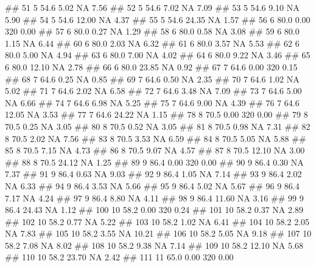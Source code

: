 \documentclass[10pt,]{krantz}
\makeatletter
\newenvironment{Shaded}{\begin{snugshade}}{\end{snugshade}}
\newcommand{\NormalTok}[1]{#1}
\newenvironment{kframe}{%
\medskip{}
\setlength{\fboxsep}{.8em}
 \def\at@end@of@kframe{}%
 \ifinner\ifhmode%
  \def\at@end@of@kframe{\end{minipage}}%
  \begin{minipage}{\columnwidth}%
 \fi\fi%
 \def\FrameCommand##1{\hskip\@totalleftmargin \hskip-\fboxsep
 \colorbox{shadecolor}{##1}\hskip-\fboxsep
     \hskip-\linewidth \hskip-\@totalleftmargin \hskip\columnwidth}%
 \MakeFramed {\advance\hsize-\width
   \@totalleftmargin\z@ \linewidth\hsize
   \@setminipage}}%
 {\par\unskip\endMakeFramed%
 \at@end@of@kframe}
\renewenvironment{Shaded}{\begin{kframe}}{\end{kframe}}
\theoremstyle{definition}
\theoremstyle{definition}
\theoremstyle{remark}
\makeatother
\begin{document}
\begin{Shaded}
\begin{Highlighting}[]
\NormalTok{## 51   5 54.6  5.02  NA  7.56}
\NormalTok{## 52   5 54.6  7.02  NA  7.09}
\NormalTok{## 53   5 54.6  9.10  NA  5.90}
\NormalTok{## 54   5 54.6 12.00  NA  4.37}
\NormalTok{## 55   5 54.6 24.35  NA  1.57}
\NormalTok{## 56   6 80.0  0.00 320  0.00}
\NormalTok{## 57   6 80.0  0.27  NA  1.29}
\NormalTok{## 58   6 80.0  0.58  NA  3.08}
\NormalTok{## 59   6 80.0  1.15  NA  6.44}
\NormalTok{## 60   6 80.0  2.03  NA  6.32}
\NormalTok{## 61   6 80.0  3.57  NA  5.53}
\NormalTok{## 62   6 80.0  5.00  NA  4.94}
\NormalTok{## 63   6 80.0  7.00  NA  4.02}
\NormalTok{## 64   6 80.0  9.22  NA  3.46}
\NormalTok{## 65   6 80.0 12.10  NA  2.78}
\NormalTok{## 66   6 80.0 23.85  NA  0.92}
\NormalTok{## 67   7 64.6  0.00 320  0.15}
\NormalTok{## 68   7 64.6  0.25  NA  0.85}
\NormalTok{## 69   7 64.6  0.50  NA  2.35}
\NormalTok{## 70   7 64.6  1.02  NA  5.02}
\NormalTok{## 71   7 64.6  2.02  NA  6.58}
\NormalTok{## 72   7 64.6  3.48  NA  7.09}
\NormalTok{## 73   7 64.6  5.00  NA  6.66}
\NormalTok{## 74   7 64.6  6.98  NA  5.25}
\NormalTok{## 75   7 64.6  9.00  NA  4.39}
\NormalTok{## 76   7 64.6 12.05  NA  3.53}
\NormalTok{## 77   7 64.6 24.22  NA  1.15}
\NormalTok{## 78   8 70.5  0.00 320  0.00}
\NormalTok{## 79   8 70.5  0.25  NA  3.05}
\NormalTok{## 80   8 70.5  0.52  NA  3.05}
\NormalTok{## 81   8 70.5  0.98  NA  7.31}
\NormalTok{## 82   8 70.5  2.02  NA  7.56}
\NormalTok{## 83   8 70.5  3.53  NA  6.59}
\NormalTok{## 84   8 70.5  5.05  NA  5.88}
\NormalTok{## 85   8 70.5  7.15  NA  4.73}
\NormalTok{## 86   8 70.5  9.07  NA  4.57}
\NormalTok{## 87   8 70.5 12.10  NA  3.00}
\NormalTok{## 88   8 70.5 24.12  NA  1.25}
\NormalTok{## 89   9 86.4  0.00 320  0.00}
\NormalTok{## 90   9 86.4  0.30  NA  7.37}
\NormalTok{## 91   9 86.4  0.63  NA  9.03}
\NormalTok{## 92   9 86.4  1.05  NA  7.14}
\NormalTok{## 93   9 86.4  2.02  NA  6.33}
\NormalTok{## 94   9 86.4  3.53  NA  5.66}
\NormalTok{## 95   9 86.4  5.02  NA  5.67}
\NormalTok{## 96   9 86.4  7.17  NA  4.24}
\NormalTok{## 97   9 86.4  8.80  NA  4.11}
\NormalTok{## 98   9 86.4 11.60  NA  3.16}
\NormalTok{## 99   9 86.4 24.43  NA  1.12}
\NormalTok{## 100 10 58.2  0.00 320  0.24}
\NormalTok{## 101 10 58.2  0.37  NA  2.89}
\NormalTok{## 102 10 58.2  0.77  NA  5.22}
\NormalTok{## 103 10 58.2  1.02  NA  6.41}
\NormalTok{## 104 10 58.2  2.05  NA  7.83}
\NormalTok{## 105 10 58.2  3.55  NA 10.21}
\NormalTok{## 106 10 58.2  5.05  NA  9.18}
\NormalTok{## 107 10 58.2  7.08  NA  8.02}
\NormalTok{## 108 10 58.2  9.38  NA  7.14}
\NormalTok{## 109 10 58.2 12.10  NA  5.68}
\NormalTok{## 110 10 58.2 23.70  NA  2.42}
\NormalTok{## 111 11 65.0  0.00 320  0.00}

\end{Highlighting}
\end{Shaded}
\end{document}
